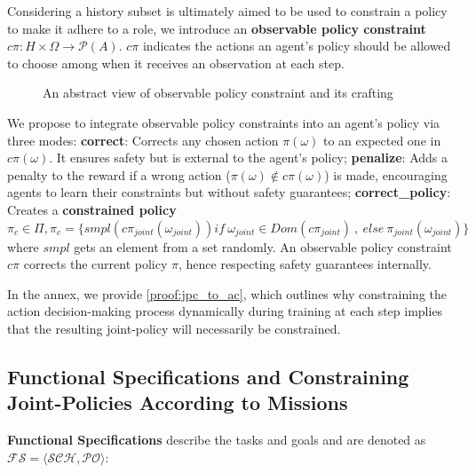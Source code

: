 \documentclass[runningheads]{llncs}
\theoremstyle{freethm}
\theoremstyle{proofoutline}
\newcounter{proof}
\begin{document}
Considering a history subset is ultimately aimed to be used to constrain a policy to make it adhere to a role, we introduce an \textbf{observable policy constraint} $c\pi: H \times \Omega \rightarrow \mathcal{P}(A)$. $c\pi$ indicates the actions an agent's policy should be allowed to choose among when it receives an observation at each step.

\begin{figure}[h!]
    \centering
    
    \caption{An abstract view of observable policy constraint and its crafting}
    \label{fig:PRAHOM_opc}
\end{figure}

We propose to integrate observable policy constraints into an agent's policy via three modes:
\textbf{correct}: Corrects any chosen action $\pi(\omega)$ to an expected one in $c\pi(\omega)$. It ensures safety but is external to the agent's policy; \quad
\textbf{penalize}: Adds a penalty to the reward if a wrong action ($\pi(\omega) \notin c\pi(\omega)$) is made, encouraging agents to learn their constraints but without safety guarantees; \quad
\textbf{correct\_policy}: Creates a \textbf{constrained policy} $\pi_c \in \Pi, \pi_c = \{smpl(c\pi_{joint}(\omega_{joint})) \allowbreak if \ \omega_{joint} \in Dom(c\pi_{joint}) \ \allowbreak, \ \allowbreak else \ \allowbreak \pi_{joint}(\omega_{joint})\}$ where $smpl$ gets an element from a set randomly. An observable policy constraint $c\pi$ corrects the current policy $\pi$, hence respecting safety guarantees internally.

In the annex, we provide \autoref{proof:jpc_to_ac}, which outlines why constraining the action decision-making process dynamically during training at each step implies that the resulting joint-policy will necessarily be constrained.


\subsection{Functional Specifications and Constraining Joint-Policies According to Missions}

\textbf{Functional Specifications} describe the tasks and goals and are denoted as $\mathcal{FS} = \langle \mathcal{SCH}, \mathcal{PO} \rangle$:
\end{document}
